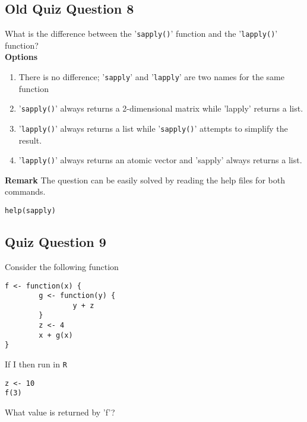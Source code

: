 \documentclass[12pt]{article}
\begin{document}
\newpage
\subsection*{Old Quiz Question 8}
What is the difference between the '\texttt{sapply()}' function and the '\texttt{lapply()}' function?\\

\bigskip
\noindent \textbf{Options}
\begin{enumerate}
\item There is no difference; '\texttt{sapply}' and '\texttt{lapply}' are two names for the same function
\item '\texttt{sapply()}' always returns a 2-dimensional matrix while 'lapply' returns a list.
\item '\texttt{lapply()}' always returns a list while '\texttt{sapply()}' attempts to simplify the result. %
\item '\texttt{lapply()}' always returns an atomic vector and 'sapply' always returns a list.
\end{enumerate}

\bigskip
\noindent \textbf{Remark}
\noindent The question can be easily solved by reading the help files for both commands.
\begin{verbatim}
help(sapply)
\end{verbatim}
\newpage
\subsection*{Quiz Question 9}
Consider the following function
\begin{verbatim}
f <- function(x) {
        g <- function(y) {
                y + z
        }
        z <- 4
        x + g(x)
}
\end{verbatim}

If I then run in \texttt{R}
\begin{verbatim}
z <- 10
f(3)
\end{verbatim}
What value is returned by 'f'?

\newpage
\end{document}
